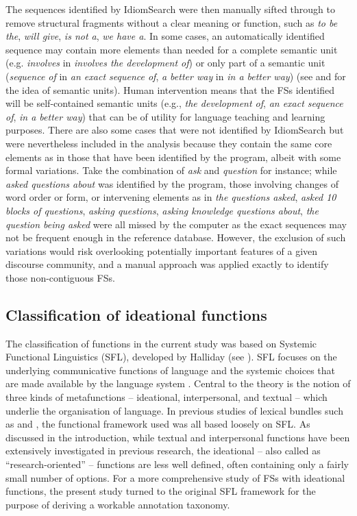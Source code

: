 \documentclass[output=paper]{langscibook}
\begin{document}
The sequences identified by IdiomSearch were then manually sifted through to remove structural fragments without a clear meaning or function, such as \textit{to be the}, \textit{will give}, \textit{is not a}, \textit{we have a}. In some cases, an automatically identified sequence may contain more elements than needed for a complete semantic unit (e.g. \textit{involves} in \textit{involves the development of}) or only part of a semantic unit (\textit{sequence of} in \textit{an exact sequence of}, \textit{a better way} in \textit{in a better way}) (see \citealt{MartinezSchmitt2012} and \citealt{Buerki2016} for the idea of semantic units). Human intervention means that the FSs identified will be self-contained semantic units (e.g., \textit{the development of}, \textit{an exact sequence of}, \textit{in a better way}) that can be of utility for language teaching and learning purposes. There are also some cases that were not identified by IdiomSearch but were nevertheless included in the analysis because they contain the same core elements as in those that have been identified by the program, albeit with some formal variations. Take the combination of \textit{ask} and \textit{question} for instance; while \textit{asked questions about} was identified by the program, those involving changes of word order or form, or intervening elements as in \textit{the questions asked}, \textit{asked 10 blocks of questions}, \textit{asking questions}, \textit{asking knowledge questions about}, \textit{the question being asked} were all missed by the computer as the exact sequences may not be frequent enough in the reference database. However, the exclusion of such variations would risk overlooking potentially important features of a given discourse community, and a manual approach was applied exactly to identify those non-contiguous FSs.

\subsection{Classification of ideational functions}

The classification of functions in the current study was based on Systemic Functional Linguistics (SFL), developed by Halliday (see \citealt{Halliday2014}). SFL focuses on the underlying communicative functions of language and the systemic choices that are made available by the language system \citep{Gledhill2011}. Central to the theory is the notion of three kinds of metafunctions – ideational, interpersonal, and textual – which underlie the organisation of language. In previous studies of lexical bundles such as \citet{Hyland2008} and \citet{BiberEtAl2004}, the functional framework used was all based loosely on SFL. As discussed in the introduction, while textual and interpersonal functions have been extensively investigated in previous research, the ideational – also called as ``research-oriented'' – functions are less well defined, often containing only a fairly small number of options. For a more comprehensive study of FSs with ideational functions, the present study turned to the original SFL framework for the purpose of deriving a workable annotation taxonomy.
\end{document}
